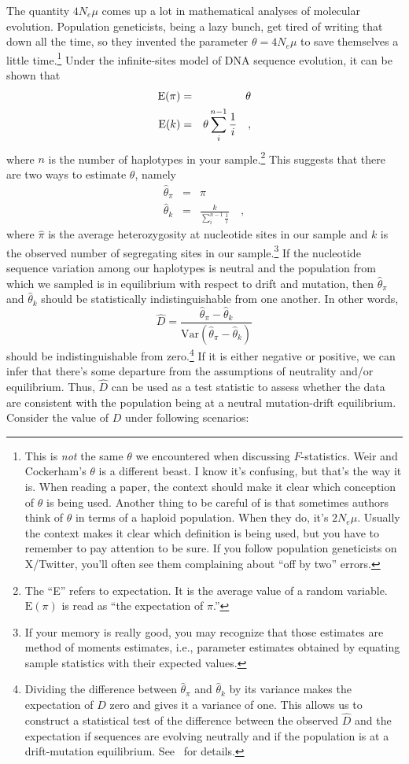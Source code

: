 \documentclass[12pt]{article}
\begin{document}
The quantity $4N_e\mu$ comes up a lot in mathematical analyses of
molecular evolution. Population geneticists, being a lazy bunch, get
tired of writing that down all the time, so they invented the
parameter $\theta = 4N_e\mu$ to save themselves a little
time.\footnote{This is {\it not\/} the same $\theta$ we encountered
  when discussing $F$-statistics. Weir and Cockerham's $\theta$ is a
  different beast. I know it's confusing, but that's the way it
  is. When reading a paper, the context should make it clear which
  conception of $\theta$ is being used. Another thing to be careful of
  is that sometimes authors think of $\theta$ in terms of a haploid
  population. When they do, it's $2N_e\mu$. Usually the context makes
  it clear which definition is being used, but you have to remember to
  pay attention to be sure. If you follow population geneticists on
  X/Twitter, you'll often see them complaining about ``off by two''
  errors.} Under the infinite-sites model of DNA sequence evolution,
it can be shown that
\begin{eqnarray*}
\mbox{E}(\pi) &=& \theta \\
\mbox{E}(k) &=& \theta\sum_i^{n-1} \frac{1}{i} \quad ,
\end{eqnarray*}
where $n$ is the number of haplotypes in your sample.\footnote{The
  ``E'' refers to expectation. It is the average value of a random
  variable. $\mbox{E}(\pi)$ is read as ``the expectation of $\pi$.''}
This suggests that there are two ways to estimate $\theta$, namely
\begin{eqnarray*}
\hat \theta_\pi &=& \hat \pi \\
\hat \theta_k   &=& \frac{k}{\sum_i^{n-1}\frac{1}{i}} \quad ,
\end{eqnarray*}
where $\hat\pi$ is the average heterozygosity at nucleotide sites in
our sample and $k$ is the observed number of segregating sites in our
sample.\footnote{If your memory is really good, you may recognize that
  those estimates are method of moments estimates, i.e., parameter
  estimates obtained by equating sample statistics with their expected
  values.} If the nucleotide sequence variation among our haplotypes
is neutral and the population from which we sampled is in equilibrium
with respect to drift and mutation, then $\hat\theta_\pi$ and
$\hat\theta_k$ should be statistically indistinguishable from one
another. In other words,
\[
\hat D = \frac{\hat\theta_\pi -
  \hat\theta_k}{\mbox{Var}(\hat\theta_\pi - \hat\theta_k)} 
\]
should be indistinguishable from zero.\footnote{Dividing the
  difference between $\hat\theta_\pi$ and $\hat\theta_k$ by its
  variance makes the expectation of $\hat D$ zero and gives it a
  variance of one. This allows us to construct a statistical test of
  the difference between the observed $\hat D$ and the expectation if
  sequences are evolving neutrally and if the population is at a
  drift-mutation equilibrium. See~\cite{Tajima89} for details.} If it
is either negative or positive, we can infer that there's some
departure from the assumptions of neutrality and/or equilibrium. Thus,
$\hat D$ can be used as a test statistic to assess whether the data
are consistent with the population being at a neutral mutation-drift
equilibrium. Consider the value of $D$ under following
scenarios:
\end{document}
